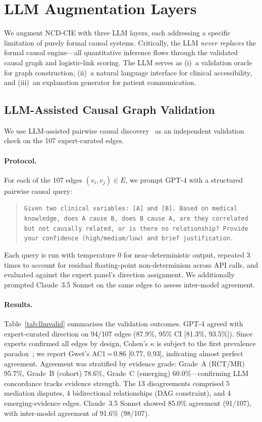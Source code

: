 \documentclass[runningheads]{llncs}
\begin{document}
\section{LLM Augmentation Layers}\label{sec:llm}

We augment NCD-CIE with three LLM layers, each addressing a
specific limitation of purely formal causal systems.
Critically, the LLM \emph{never replaces} the formal causal
engine---all quantitative inference flows through the
validated causal graph and logistic-link scoring.
The LLM serves as (i)~a validation oracle for graph construction,
(ii)~a natural language interface for clinical accessibility, and
(iii)~an explanation generator for patient communication.

\subsection{LLM-Assisted Causal Graph Validation}\label{sec:llmvalidation}

We use LLM-assisted pairwise causal
discovery~\cite{kiciman2023causal} as an independent validation
check on the 107 expert-curated edges.

\paragraph{Protocol.}
For each of the 107 edges $(v_i, v_j) \in E$, we prompt GPT-4
with a structured pairwise causal query:
\begin{quote}
\small\texttt{Given two clinical variables: [A] and [B].
Based on medical knowledge, does A \emph{cause} B, does B cause A,
are they correlated but not causally related, or is there no
relationship? Provide your confidence (high/medium/low) and
brief justification.}
\end{quote}
Each query is run with temperature 0 for near-deterministic output,
repeated 3 times to account for residual floating-point
non-determinism across API calls, and evaluated against the expert
panel's direction assignment.
We additionally prompted Claude~3.5 Sonnet on the same edges to
assess inter-model agreement.

\paragraph{Results.}
Table~\ref{tab:llmvalid} summarises the validation outcomes.
GPT-4 agreed with expert-curated direction on 94/107 edges
(87.9\%, 95\% CI [81.3\%, 93.5\%]).
Since experts confirmed all edges by design, Cohen's $\kappa$ is
subject to the first prevalence paradox~\cite{feinstein1990kappa};
we report Gwet's AC1\,=\,0.86 [0.77, 0.93], indicating almost
perfect agreement.
Agreement was stratified by evidence grade:
Grade~A (RCT/MR) 95.7\%, Grade~B (cohort) 78.6\%, Grade~C
(emerging) 60.0\%---confirming LLM concordance tracks evidence
strength.
The 13 disagreements comprised 5 mediation disputes, 4 bidirectional
relationships (DAG constraint), and 4 emerging-evidence edges.
Claude~3.5 Sonnet showed 85.0\% agreement (91/107), with
inter-model agreement of 91.6\% (98/107).
\end{document}

